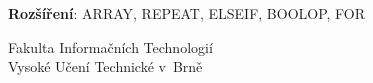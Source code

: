 \begin{titlepage}
\begin{flushleft}
\begin{tabular}{l l l l l}
\end{tabular}
\newline
\newline
\textbf{Rozšíření}: ARRAY, REPEAT, ELSEIF, BOOLOP, FOR
\vfill
\begin{large}
Fakulta Informačních Technologií \\
Vysoké Učení Technické v~Brně \\
\end{large}
\end{flushleft}
\end{titlepage}